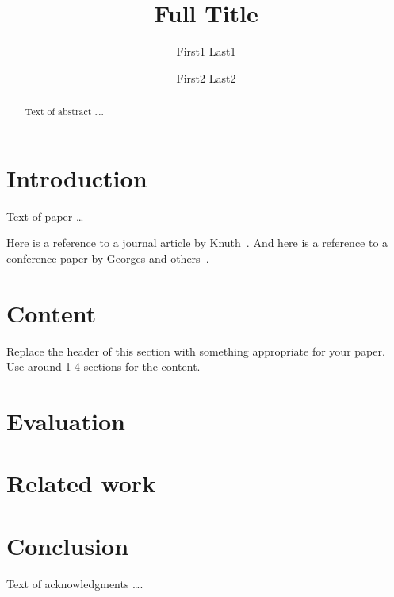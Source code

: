 \documentclass[sigplan,10pt]{acmart}
\begin{document}
\title[Short Title]{Full Title}         %



\author{First1 Last1}

\author{First2 Last2}


\begin{abstract}
Text of abstract \ldots.
\end{abstract}


\maketitle


\section{Introduction}

Text of paper \ldots

Here is a reference to a journal article by Knuth~\cite{Knuth68}. And here is a reference to a conference paper by Georges and others~\cite{GeorgesBE07}.

\lipsum[1-3] %

\section{Content}
Replace the header of this section with something appropriate for your paper. Use around 1-4 sections for the content.

\lipsum[4-10] %


\section{Evaluation}

\lipsum[11-13] %


\section{Related work}

\lipsum[14-15] %

\section{Conclusion}

\lipsum[16-17] %

\begin{acks}
Text of acknowledgments \ldots.
\end{acks}



\end{document}
